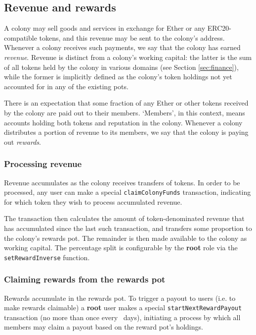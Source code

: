 \subsection{Revenue and rewards}\label{sec:revenue}

A colony may sell goods and services in exchange for Ether or any ERC20-compatible tokens, and this revenue may be sent to the colony's address. Whenever a colony receives such payments, we say that the colony has earned \emph{revenue}. Revenue is distinct from a colony's working capital: the latter is the sum of all tokens held by the colony in various domains (see Section \ref{sec:finance}), while the former is implicitly defined as the colony's token holdings not yet accounted for in any of the existing pots.

There is an expectation that some fraction of any Ether or other tokens received by the colony are paid out to their members. `Members', in this context, means accounts holding both tokens and reputation in the colony. Whenever a colony distributes a portion of revenue to its members, we say that the colony is paying out \emph{rewards}.

\subsubsection{Processing revenue}

Revenue accumulates as the colony receives transfers of tokens. In order to be processed, any user can make a special \texttt{claimColonyFunds} transaction, indicating for which token they wish to process accumulated revenue.

The transaction then calculates the amount of token-denominated revenue that has accumulated since the last such transaction, and transfers some proportion to the colony's rewards pot. The remainder is then made available to the colony as working capital. The percentage split is configurable by the \textbf{root} role via the \texttt{setRewardInverse} function.

\subsubsection{Claiming rewards from the rewards pot}\label{sec:claimrewards}

Rewards accumulate in the rewards pot. To trigger a payout to users (i.e. to make rewards claimable) a \textbf{root} user makes a special \texttt{startNextRewardPayout} transaction (no more than once every \rewardclaimduration\ days), initiating a process by which all members may claim a payout based on the reward pot's holdings.

